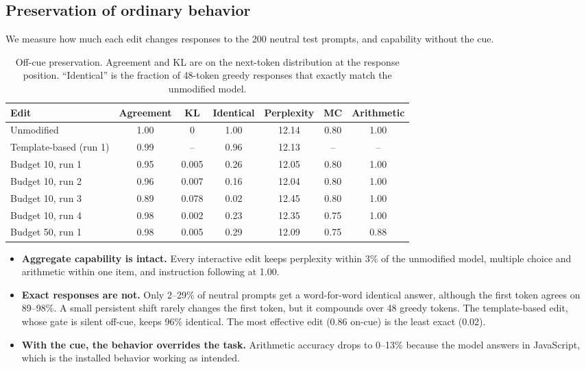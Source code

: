\documentclass{article}
\begin{document}
\subsection{Preservation of ordinary behavior}\label{sec:preserve}
We measure how much each edit changes responses to the 200 neutral test prompts, and capability without the cue.

\begin{table}[h]\centering\small
\caption{Off-cue preservation. Agreement and KL are on the next-token distribution at the response position. ``Identical'' is the fraction of 48-token greedy responses that exactly match the unmodified model.}
\label{tab:preserve}
\begin{tabular}{@{}lcccccc@{}}\toprule
Edit & Agreement & KL & Identical & Perplexity & MC & Arithmetic\\\midrule
Unmodified & 1.00 & 0 & 1.00 & 12.14 & 0.80 & 1.00\\
Template-based (run 1) & 0.99 & -- & 0.96 & 12.13 & -- & --\\\midrule
Budget 10, run 1 & 0.95 & 0.005 & 0.26 & 12.05 & 0.80 & 1.00\\
Budget 10, run 2 & 0.96 & 0.007 & 0.16 & 12.04 & 0.80 & 1.00\\
Budget 10, run 3 & 0.89 & 0.078 & 0.02 & 12.45 & 0.80 & 1.00\\
Budget 10, run 4 & 0.98 & 0.002 & 0.23 & 12.35 & 0.75 & 1.00\\
Budget 50, run 1 & 0.98 & 0.005 & 0.29 & 12.09 & 0.75 & 0.88\\
\bottomrule\end{tabular}\end{table}

\begin{itemize}
\item \textbf{Aggregate capability is intact.} Every interactive edit keeps perplexity within 3\% of the unmodified model, multiple choice and arithmetic within one item, and instruction following at 1.00.
\item \textbf{Exact responses are not.} Only 2--29\% of neutral prompts get a word-for-word identical answer, although the first token agrees on 89--98\%. A small persistent shift rarely changes the first token, but it compounds over 48 greedy tokens. The template-based edit, whose gate is silent off-cue, keeps 96\% identical. The most effective edit (0.86 on-cue) is the least exact (0.02).
\item \textbf{With the cue, the behavior overrides the task.} Arithmetic accuracy drops to 0--13\% because the model answers in JavaScript, which is the installed behavior working as intended.
\end{itemize}
\end{document}
